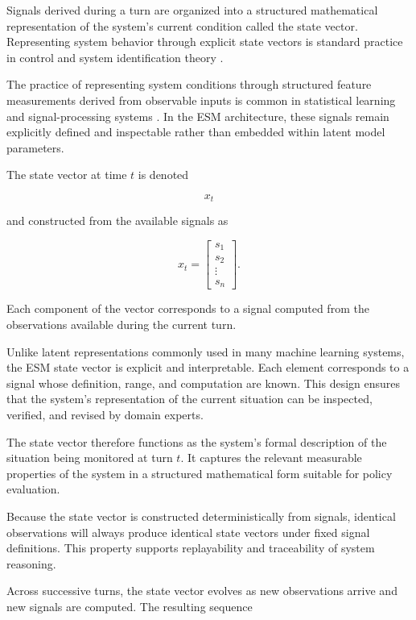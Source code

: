 \documentclass[11pt]{article}
\begin{document}
Signals derived during a turn are organized into a structured mathematical representation of the system’s current condition called the state vector. Representing system behavior through explicit state vectors is standard practice in control and system identification theory \citep{ljung1999}.

The practice of representing system conditions through structured feature measurements derived from observable inputs is common in statistical learning and signal-processing systems \citep{bishop2006,raghavan2014}. In the ESM architecture, these signals remain explicitly defined and inspectable rather than embedded within latent model parameters.

The state vector at time $t$ is denoted

\begin{equation}
x_t
\end{equation}

and constructed from the available signals as

\begin{equation}
x_t =
\begin{bmatrix}
s_1 \\
s_2 \\
\vdots \\
s_n
\end{bmatrix}.
\end{equation}

Each component of the vector corresponds to a signal computed from the observations available during the current turn.

Unlike latent representations commonly used in many machine learning systems, the ESM state vector is explicit and interpretable. Each element corresponds to a signal whose definition, range, and computation are known. This design ensures that the system's representation of the current situation can be inspected, verified, and revised by domain experts.

The state vector therefore functions as the system's formal description of the situation being monitored at turn $t$. It captures the relevant measurable properties of the system in a structured mathematical form suitable for policy evaluation.

Because the state vector is constructed deterministically from signals, identical observations will always produce identical state vectors under fixed signal definitions. This property supports replayability and traceability of system reasoning.

Across successive turns, the state vector evolves as new observations arrive and new signals are computed. The resulting sequence
\end{document}
